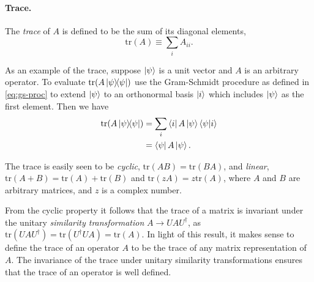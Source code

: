 \paragraph{Trace.} The \emph{trace} of $A$ is defined to be the sum of its
diagonal elements, \begin{equation}
  \mathrm{tr}(A) \equiv \sum_i A_{ii}. \label{eq:tr}
\end{equation}

As an example of the trace, suppose $\ket{\psi}$ is a unit vector and $A$ is an
arbitrary operator. To evaluate $\mathrm{tr}(A\ketbra{\psi}{\psi})$ use the
Gram-Schmidt procedure as defined in \eqref{eq:gs-proc} to extend $\ket{\psi}$
to an orthonormal basis $\ket{i}$ which includes $\ket{\psi}$ as the first
element. Then we have \begin{align*}
  \mathrm{tr}(A\ketbra{\psi}{\psi})
    &= \sum_i \bra{i}A\ket{\psi} \braket{\psi}{i} \\
    &= \bra{\psi}A\ket{\psi}.
\end{align*}

The trace is easily seen to be \emph{cyclic}, $\mathrm{tr}(AB) =
\mathrm{tr}(BA)$, and \emph{linear}, $\mathrm{tr}(A + B) = \mathrm{tr}(A) +
\mathrm{tr}(B)$ and $\mathrm{tr}(zA) = z\mathrm{tr}(A)$, where $A$ and $B$ are
arbitrary matrices, and $z$ is a complex number.

From the cyclic property it follows that the trace of a matrix is invariant
under the unitary \emph{similarity transformation} $A \rightarrow U A
U^\dagger$, as $\mathrm{tr}(U A U^\dagger) = \mathrm{tr}(U^\dagger U A) =
\mathrm{tr}(A)$. In light of this result, it makes sense to define the trace
of an operator $A$ to be the trace of any matrix representation of $A$. The
invariance of the trace under unitary similarity transformations ensures that
the trace of an operator is well defined.

